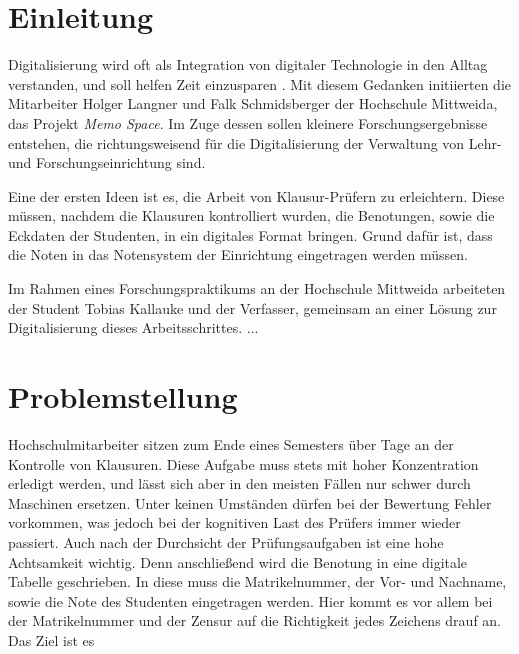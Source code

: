 \documentclass[nomenclature, 150]{HSMW-Thesis}
\begin{document}
\begin{Referat}
\end{Referat}


\Hauptteil

\chapter{Einleitung}
	Digitalisierung wird oft als Integration von digitaler Technologie in den Alltag verstanden, und soll helfen Zeit einzusparen \cite{digital}. Mit diesem Gedanken initiierten die Mitarbeiter Holger Langner und Falk Schmidsberger der Hochschule Mittweida, das Projekt \textit{Memo Space}. Im Zuge dessen sollen kleinere Forschungsergebnisse entstehen, die richtungsweisend für die Digitalisierung der Verwaltung von Lehr- und Forschungseinrichtung sind.

	Eine der ersten Ideen  ist es, die Arbeit von Klausur-Prüfern zu erleichtern. Diese müssen, nachdem die Klausuren kontrolliert wurden, die Benotungen, sowie die Eckdaten der Studenten, in ein digitales Format bringen. Grund dafür ist, dass die Noten in das Notensystem der Einrichtung eingetragen werden müssen. 

	Im Rahmen eines Forschungspraktikums an der Hochschule Mittweida arbeiteten der Student Tobias Kallauke und der Verfasser, gemeinsam an einer Lösung zur Digitalisierung dieses Arbeitsschrittes. ...

\chapter{Problemstellung} 
	Hochschulmitarbeiter sitzen zum Ende eines Semesters über Tage an der Kontrolle von Klausuren. Diese Aufgabe muss stets mit hoher Konzentration erledigt werden, und lässt sich aber in den meisten Fällen nur schwer durch Maschinen ersetzen. Unter keinen Umständen dürfen bei der Bewertung Fehler vorkommen, was jedoch bei der kognitiven Last des Prüfers immer wieder passiert. Auch nach der Durchsicht der Prüfungsaufgaben ist eine hohe Achtsamkeit wichtig. Denn anschließend wird die Benotung in eine digitale Tabelle geschrieben. In diese muss die Matrikelnummer, der Vor- und Nachname, sowie die Note des Studenten eingetragen werden. Hier kommt es vor allem bei der Matrikelnummer und der Zensur auf die Richtigkeit jedes Zeichens drauf an.
	Das Ziel ist es 
\end{document}
